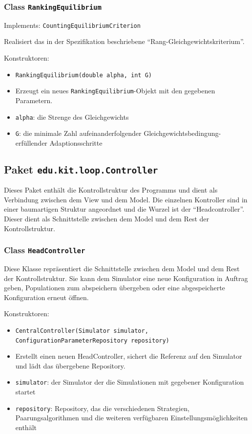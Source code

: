 \documentclass[parskip=full,11pt]{scrartcl}
\begin{document}
\subsubsection{Class \texttt{RankingEquilibrium}}
Implements: \texttt{CountingEquilibriumCriterion}

Realisiert das in der Spezifikation beschriebene \enquote{Rang-Gleichgewichtskriterium}.

Konstruktoren:
\begin{itemize}\itemsep -10pt
\item \texttt{RankingEquilibrium(double alpha, int G)}
\item[] Erzeugt ein neues \texttt{RankingEquilibrium}-Objekt mit den gegebenen Parametern.
\item[] \texttt{alpha}: die Strenge des Gleichgewichts
\item[] \texttt{G}: die minimale Zahl aufeinanderfolgender Gleichgewichtsbedingung-erfüllender Adaptionsschritte
\end{itemize}

\subsection{Paket \texttt{edu.kit.loop.Controller}}
Dieses Paket enthält die Kontrollstruktur des Programms und dient als Verbindung zwischen dem View und dem Model.
Die einzelnen Kontroller sind in einer baumartigen Struktur angeordnet und die Wurzel ist der \enquote{Headcontroller}. Dieser dient als Schnittstelle zwischen dem Model und dem Rest der Kontrollstruktur.

\subsubsection{Class \texttt{HeadController}}
Diese Klasse repräsentiert die Schnittstelle zwischen dem Model und dem Rest der Kontrollstruktur. Sie kann dem Simulator eine neue Konfiguration in Auftrag geben, Populationen zum abspeichern übergeben oder eine abgespeicherte Konfiguration erneut öffnen.

Konstruktoren:
\begin{itemize}\itemsep -10pt
\item \texttt{CentralController(Simulator simulator, ConfigurationParameterRepository repository)}
\item[] Erstellt einen neuen HeadController, sichert die Referenz auf den Simulator und lädt das übergebene Repository.
\item[] \texttt{simulator}: der Simulator der die Simulationen mit gegebener Konfiguration startet
\item[] \texttt{repository}: Repository, das die verschiedenen Strategien, Paarungsalgorithmen und die weiteren verfügbaren Einstellungsmöglichkeiten enthält
\end{itemize}
\end{document}
